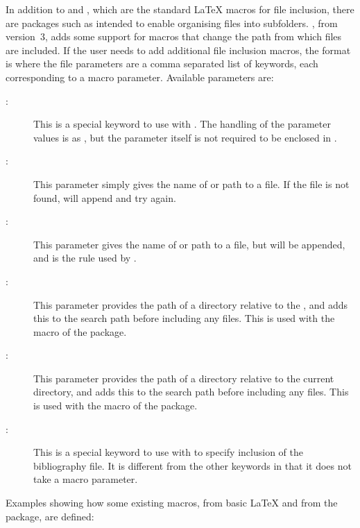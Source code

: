 \documentclass{article}
\begin{document}
In addition to  and , which are the standard \LaTeX{} macros for file inclusion, there are packages such as  intended to enable organising files into subfolders. \TeXcount{}, from version~3, adds some support for macros that change the path from which files are included. If the user needs to add additional file inclusion macros, the format is
where the file parameters are a comma separated list of keywords, each corresponding to a macro parameter. Available parameters are:
%
\begin{description}

\item[:] This is a special keyword to use with . The handling of the parameter values is as , but the parameter itself is not required to be enclosed in \code{\{\}}.

\item[:] This parameter simply gives the name of or path to a file. If the file is not found, \TeXcount{} will append  and try again.

\item[:] This parameter gives the name of or path to a file, but  will be appended, and is the rule used by .

\item[:] This parameter provides the path of a directory relative to the , and adds this to the search path before including any files. This is used with the  macro of the  package.

\item[:] This parameter provides the path of a directory relative to the current directory, and adds this to the search path before including any files. This is used with the  macro of the  package.

\item[:] This is a special keyword to use with  to specify inclusion of the bibliography file. It is different from the other keywords in that it does not take a macro parameter.

\end{description}

Examples showing how some existing macros, from basic \LaTeX{} and from the  package, are defined:
\end{document}
